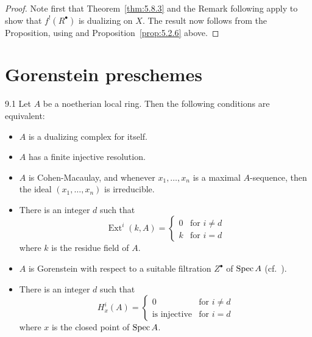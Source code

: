 \begin{proof}
Note first that Theorem~\ref{thm:5.8.3} and the Remark following apply to show that $f^{!}(R^\bullet)$ is dualizing on $X$. The result now follows from the Proposition, using  and Proposition~\ref{prop:5.2.6} above.
\end{proof}

\par\endgroup

\section{Gorenstein preschemes}\label{sec:5.9}
\begingroup
\setlength{\emergencystretch}{2em}

\begin{booktheorem}{9.1}\label{thm:5.9.1}
Let $A$ be a noetherian local ring. Then the following conditions are equivalent:
\begin{itemize}
\item[(i)] $A$ is a dualizing complex for itself.
\item[(ii)] $A$ has a finite injective resolution.
\item[(iii)] $A$ is Cohen-Macaulay, and whenever $x_1,\dots,x_n$ is a maximal $A$-sequence, then the ideal $(x_1,\dots,x_n)$ is irreducible.
\item[(iv)] There is an integer $d$ such that
\[
\operatorname{Ext}^{i}(k,A) = \begin{cases} 0 & \text{for } i\neq d \\ k & \text{for } i = d \end{cases}
\]
where $k$ is the residue field of $A$.
\item[(v)] $A$ is Gorenstein with respect to a suitable filtration $Z^{\bullet}$ of $\operatorname{Spec} A$ (cf.\ ).
\item[(vi)] There is an integer $d$ such that
\[
H_{x}^{i}(A) = \begin{cases} 0 & \text{for } i\neq d \\ \text{is injective} & \text{for } i = d \end{cases}
\]
where $x$ is the closed point of $\operatorname{Spec} A$.
\end{itemize}
\end{booktheorem}

